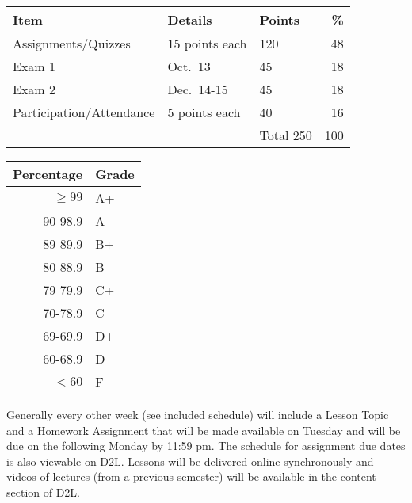 \documentclass{tufte-handout}
\begin{document}




\begin{table}
\begin{tabular}{l l l r}
Item & Details & Points &  \% \\
\hline
Assignments/Quizzes  &  15 points each & 120 & 48\\
Exam 1 & Oct.~13 & 45 & 18 \\
Exam 2 & Dec.~14-15 & 45 & 18 \\
Participation/Attendance & 5 points each & 40 & 16\\
\hline
& &  Total 250 & 100 
\end{tabular}
\end{table}
\begin{margintable}
\begin{tabular}{rl}
Percentage & Grade \\
\hline 
$\ge99$ & A+ \\
90-98.9 & A \\
89-89.9 & B+ \\
80-88.9 & B \\
79-79.9 & C+ \\
70-78.9 & C \\
69-69.9 & D+ \\
60-68.9 & D \\
$<60$ & F \\
\hline
\end{tabular}
\end{margintable}





Generally every other week (see included schedule) will include a Lesson Topic and a Homework Assignment that will be made available on Tuesday and will be due on the following Monday by 11:59 pm. The schedule for assignment due dates is also viewable on D2L. Lessons will be delivered online synchronously and videos of lectures (from a previous semester) will be available in the content section of D2L.
\end{document}
